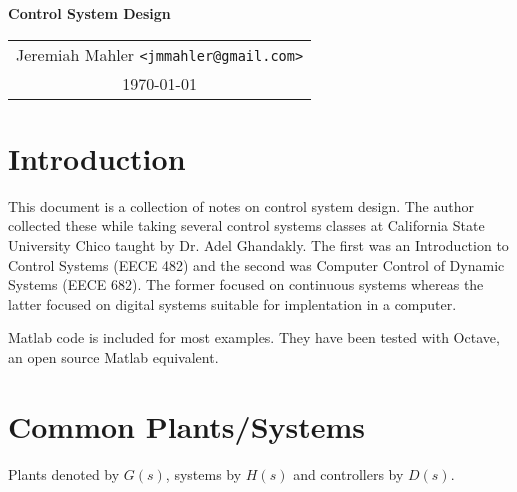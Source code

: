 \documentclass{article}
\begin{document}

\vspace*{0.5in}

\centerline{\LARGE \textbf{Control System Design}}
\vspace{0.2in}

\begin{center}
\begin{tabular}{c}
Jeremiah Mahler \texttt{<jmmahler@gmail.com>} \\
\today
\end{tabular}
\end{center}

\thispagestyle{empty}
\vfill
\pagebreak


\tableofcontents

\clearpage

\section{Introduction}

This document is a collection of notes on control system design.
The author collected these while taking several control systems
classes at California State University Chico taught by Dr. Adel Ghandakly.
The first was an Introduction to Control Systems (EECE 482) and
the second was Computer Control of Dynamic Systems (EECE 682).
The former focused on continuous systems whereas the latter focused on
digital systems suitable for implentation in a computer.

Matlab code is included for most examples.
They have been tested with Octave\autocite{octave},
an open source Matlab equivalent.

\clearpage
\section{Common Plants/Systems}

\nocite{ogata1995discrete}
\nocite{franklin1998digital}

Plants denoted by $G(s)$, systems by $H(s)$ and controllers by $D(s)$.
\end{document}

